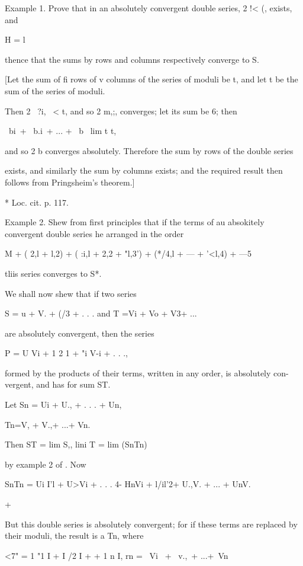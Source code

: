 Example 1. Prove that in an absolutely convergent double series, 2 !<
(, exists, and

H = l

thence that the sums by rows and columns respectively converge to S.

[Let the sum of fi rows of v columns of the series of moduli be t,
and let t be the sum of the series of moduli.

Then 2 \ ?i, \ < t, and so 2 m,;, converges; let its sum be 6;
then

\ bi\ + \ b.i\ + ... + \ b \ lim t t,

and so 2 b converges absolutely. Therefore the sum by rows of the
double series

exists, and similarly the sum by columns exists; and the required
result then follows from Pringsheim's theorem.]

* Loc. cit. p. 117.

%
%

Example 2. Shew from first principles that if the terms of au
absokitely convergent double series he arranged in the order

 M + ( 2,l + l,2) + ( :i,l + 2,2 + "l,3') + (*/4,l + --- + '<l,4) +
---5

tliis series converges to S*.


We shall now shew that if two series

S = u + V. + (/3 + . . . and T =Vi + Vo + V3+ ...

are absolutely convergent, then the series

P = U Vi + 1 2 1 + "i V-i + . . .,

formed by the products of their terms, written in any order, is
absolutely con- vergent, and has for sum ST.

Let Sn = Ui + U., + . . . + Un,

Tn=V, + V.,+ ...+ Vn.

Then ST = lim S,, lini T = lim (SnTn)

by example 2 of . Now

SnTn = Ui I'l + U>Vi + . . . 4- HnVi + l/il'2+ U.,V. + ... + UnV.

+

But this double series is absolutely convergent; for if these terms
are replaced by their moduli, the result is a Tn, where

<7" = 1 "1 I + I /2 I +    + 1 n I, rn = \ Vi \ + \ v.,\ + ...+\
Vn\,

